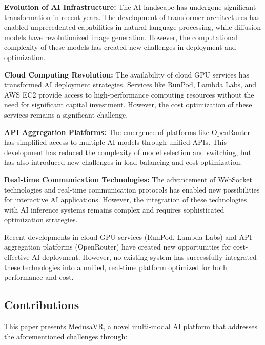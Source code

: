 \documentclass[conference]{IEEEtran}
\begin{document}
\textbf{Evolution of AI Infrastructure:} The AI landscape has undergone significant transformation in recent years. The development of transformer architectures has enabled unprecedented capabilities in natural language processing, while diffusion models have revolutionized image generation. However, the computational complexity of these models has created new challenges in deployment and optimization.

\textbf{Cloud Computing Revolution:} The availability of cloud GPU services has transformed AI deployment strategies. Services like RunPod, Lambda Labs, and AWS EC2 provide access to high-performance computing resources without the need for significant capital investment. However, the cost optimization of these services remains a significant challenge.

\textbf{API Aggregation Platforms:} The emergence of platforms like OpenRouter has simplified access to multiple AI models through unified APIs. This development has reduced the complexity of model selection and switching, but has also introduced new challenges in load balancing and cost optimization.

\textbf{Real-time Communication Technologies:} The advancement of WebSocket technologies and real-time communication protocols has enabled new possibilities for interactive AI applications. However, the integration of these technologies with AI inference systems remains complex and requires sophisticated optimization strategies.

Recent developments in cloud GPU services (RunPod, Lambda Labs) and API aggregation platforms (OpenRouter) have created new opportunities for cost-effective AI deployment. However, no existing system has successfully integrated these technologies into a unified, real-time platform optimized for both performance and cost.

\subsection{Contributions}
This paper presents MedusaVR, a novel multi-modal AI platform that addresses the aforementioned challenges through:
\end{document}
